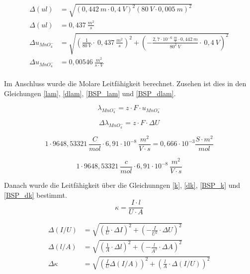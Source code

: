\begin{align}
\Delta (ul) &= \sqrt{(0,442\ m\cdot 0,4\ V)^2 (80\ V\cdot0,005\ m)^2}\label{BSP_dUL}\\
\Delta (ul) &= 0,437\ \frac{m^2}{s}\\ 
\Delta u_{MnO_4^-} &= \sqrt{ \left(\frac{1}{80\ V}\cdot\ 0,437\ \frac{m^2}{s}\right)^2 + \left(-\frac{2,7\cdot 10^{-6}\ \frac{m}{s}\cdot 0,442\ m}{80^2\ V}\cdot\ 0,4\ V\right)^2}\\
\Delta u_{MnO_4^-} &=0,00546\ \frac{m^2}{s\cdot V}\label{BSP_ibw}\\
\end{align}

Im Anschluss wurde die Molare Leitfähigkeit berechnet. Zusehen ist dies in den Gleichungen \ref{lam}, \ref{dlam}, \ref{BSP_lam} und \ref{BSP_dlam}.

\begin{equation}
\lambda_{MnO_4^-} = z\cdot F\cdot u_{MnO_4^-} 
\label{lam}
\end{equation}

\begin{equation}
\Delta\lambda_{MnO_4^-} = z\cdot F\cdot\Delta U
\label{dlam}
\end{equation}

\begin{equation}
1\cdot 9648,53321\ \frac{C}{mol}\cdot 6,91\cdot 10^{-8}\ \frac{m^2}{V\cdot s} = 0,666\cdot 10^{-3}\frac{S\cdot m^2}{mol}
\label{BSP_lam}
\end{equation}

\begin{equation}
1\cdot 9648,53321\ \frac{c}{mol}\cdot 6,91\cdot 10^{-8}\ \frac{m^2}{V\cdot s}
\label{BSP_dlam}
\end{equation}

Danach wurde die Leitfähigkeit über die Gleichunngen \ref{k}, \ref{dk}, \ref{BSP_k} und \ref{BSP_dk} bestimmt.
\begin{equation}
\kappa = \frac{I\cdot l}{U\cdot A}
\label{k}
\end{equation}

\begin{align}
\Delta(I/U) &= \sqrt{\left(\frac{1}{U}\cdot \Delta I\right)^2 + \left(-\frac{I}{U^2}\cdot\Delta U\right)^2}\label{dIU}\\
\Delta(l/A) &= \sqrt{\left(\frac{1}{A}\cdot \Delta l\right)^2+\left(-\frac{l}{A^2}\cdot\Delta A\right)^2}\label{dLA}\\
\Delta\kappa &= \sqrt{\left(\frac{I}{U}\Delta (I/A)\right)^2 + \left(\frac{l}{A}\cdot\Delta (I/U)\right)^2}\label{dk}\\
\end{align}


